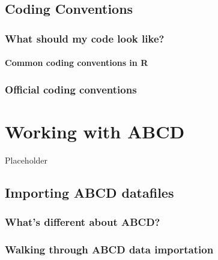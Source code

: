 \documentclass[
]{book}
\begin{document}
\hypertarget{coding-conventions}{%
\section{Coding Conventions}\label{coding-conventions}}

\hypertarget{what-should-my-code-look-like}{%
\subsection{What should my code look like?}\label{what-should-my-code-look-like}}

\hypertarget{common-coding-conventions-in-r}{%
\subsubsection{Common coding conventions in R}\label{common-coding-conventions-in-r}}

\hypertarget{official-coding-conventions}{%
\subsection{Official coding conventions}\label{official-coding-conventions}}

\hypertarget{working-with-abcd}{%
\chapter{Working with ABCD}\label{working-with-abcd}}

Placeholder

\hypertarget{importing-abcd-datafiles}{%
\section{Importing ABCD datafiles}\label{importing-abcd-datafiles}}

\hypertarget{whats-different-about-abcd}{%
\subsection{What's different about ABCD?}\label{whats-different-about-abcd}}

\hypertarget{walking-through-abcd-data-importation}{%
\subsection{Walking through ABCD data importation}\label{walking-through-abcd-data-importation}}
\end{document}
